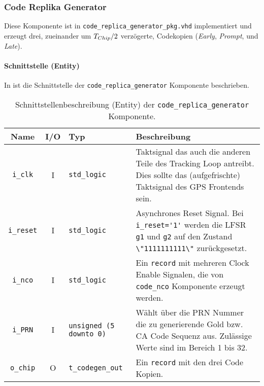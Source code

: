 \subsubsection{Code Replika Generator}
Diese Komponente ist in  \lstinline$code_replica_generator_pkg.vhd$ implementiert und erzeugt drei, zueinander um ${T}_{Chip} /2$ verzögerte, Codekopien (\emph{Early}, \emph{Prompt}, und \emph{Late}).

\paragraph{Schnittstelle (Entity)}
In  ist die Schnittstelle der \lstinline$code_replica_generator$ Komponente beschrieben.

\begin{table}[htbp]
    \ttabbox
    {
        \caption[Code Replika Generator Schnittstelle]{Schnittstellenbeschreibung (Entity) der \lstinline$code_replica_generator$ Komponente.}
        \label{TabCodeGen_Entity}
    }
    {
    \begin{tabular}{c c  p{2cm} p{6cm}}
        \toprule
        Name                    & I/O  & Typ                               & Beschreibung \\
        \midrule
        \lstinline$i_clk$       & I         & \lstinline$std_logic$             & Taktsignal das auch die anderen Teile des Tracking Loop antreibt. Dies sollte das (aufgefrischte) Taktsignal des GPS Frontends sein.\\
        \lstinline$i_reset$     & I         & \lstinline$std_logic$             & Asynchrones Reset Signal. Bei \lstinline$i_reset='1'$ werden die LFSR \lstinline$g1$ und \lstinline$g2$ auf den Zustand \lstinline$\"1111111111\"$ zurückgesetzt.\\
        \lstinline$i_nco$    & I         & \lstinline$std_logic$             & Ein \lstinline$record$ mit mehreren Clock Enable Signalen, die von \lstinline$code_nco$ Komponente erzeugt werden.\\
        \lstinline$i_PRN$       & I         & \lstinline$unsigned (5 downto 0)$ & Wählt über die PRN Nummer die zu generierende Gold bzw. \gls{CA} Code Sequenz aus. Zulässige Werte sind im Bereich 1 bis 32.\\
        \lstinline$o_chip$      & O         & \lstinline$t_codegen_out$             & Ein \lstinline$record$ mit den drei Code Kopien.\\
        \bottomrule
    \end{tabular}
}
\end{table}


